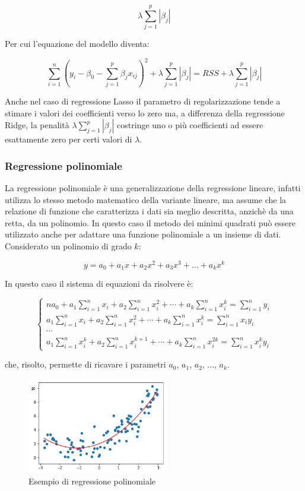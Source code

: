$$\lambda \sum_{j=1}^{p}\left|\beta_{j}\right|$$\smallskip

Per cui l'equazione del modello diventa:

$$\sum_{i=1}^{n}\left(y_{i}-\beta_{0}-\sum_{j=1}^{p} \beta_{j} x_{i j}\right)^{2}+\lambda \sum_{j=1}^{p}\left|\beta_{j}\right|=R S S+\lambda \sum_{j=1}^{p}\left|\beta_{j}\right|$$\smallskip

Anche nel caso di regressione Lasso il parametro di regolarizzazione tende a stimare i valori dei coefficienti verso lo zero ma, a differenza della regressione Ridge, la penalità $\lambda \sum_{j=1}^{p}\left|\beta_{j}\right|$ costringe uno o più coefficienti ad essere esattamente zero per certi valori di $\lambda$. \cite{tesi_polito}

\subsubsection{Regressione polinomiale}\label{sssec:regressione-polinomiale}
La regressione polinomiale è una generalizzazione della regressione lineare, infatti utilizza lo stesso metodo matematico della variante lineare, ma assume che la relazione di funzione che caratterizza i dati sia meglio descritta, anzichè da una retta, da un polinomio. In questo caso il metodo dei minimi quadrati può essere utilizzato anche per adattare una funzione polinomiale a un insieme di dati. Considerato un polinomio di grado $k$:

$$y=a_{0}+a_{1} x+a_{2} x^{2}+a_{3} x^{3}+\ldots+a_{k} x^{k}$$\smallskip

In questo caso il sistema di equazioni da risolvere è:

$$\left\{\begin{array}{l}
n a_{0}+a_{1} \sum_{i=1}^{n} x_{i}+a_{2} \sum_{i=1}^{n} x_{i}^{2}+\cdots+a_{k} \sum_{i=1}^{n} x_{i}^{k}=\sum_{i=1}^{n} y_{i} \\
a_{1} \sum_{i=1}^{n} x_{i}+a_{2} \sum_{i=1}^{n} x_{i}^{2}+\cdots+a_{k} \sum_{i=1}^{n} x_{i}^{k}=\sum_{i=1}^{n} x_{i} y_{i} \\
\cdots \\
a_{1} \sum_{i=1}^{n} x_{i}^{k}+a_{2} \sum_{i=1}^{n} x_{i}^{k+1}+\cdots+a_{k} \sum_{i=1}^{n} x_{i}^{2 k}=\sum_{i=1}^{n} x_{i}^{k} y_{i}
\end{array}\right.$$\smallskip

che, risolto, permette di ricavare i parametri $a_0$, $a_1$, $a_2$, ..., $a_k$.

\begin{figure}[H]
\centering
\includegraphics[width=0.55\textwidth,height=\textheight,keepaspectratio]{img/poly_reg_example.png}
\caption{Esempio di regressione polinomiale}
\label{fig:poly_reg}
\end{figure}

